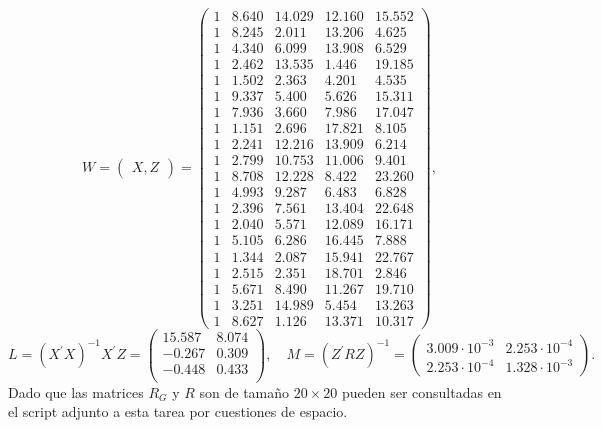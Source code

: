 \documentclass[10.5pt,notitlepage]{article}
\theoremstyle{plain}
\begin{document}
\begin{equation}\label{W}
    W = \begin{pmatrix}X , Z\end{pmatrix} = \begin{pmatrix}
1 &8.640 &14.029 &12.160 &15.552\\
 1& 8.245 &2.011&13.206 &4.625\\  
 1& 4.340 &6.099 & 13.908 &6.529\\
 1& 2.462 &13.535 & 1.446 &19.185\\
 1& 1.502 &2.363 &4.201 &4.535\\
 1& 9.337 &5.400 &5.626 &15.311\\
 1& 7.936 &3.660 &7.986 &17.047\\
 1& 1.151 &2.696 &17.821 &8.105\\
1& 2.241 &12.216 &13.909 &6.214\\ 
 1& 2.799 &10.753 &11.006 &9.401\\ 
 1 &8.708 &12.228 &8.422 &23.260\\
1& 4.993 &9.287 &6.483 &6.828\\
1& 2.396 &7.561 &13.404 &22.648\\
1& 2.040 &5.571& 12.089 &16.171\\
1& 5.105& 6.286 & 16.445 &7.888\\
1& 1.344& 2.087 &15.941 &22.767\\
1& 2.515& 2.351&18.701 &2.846\\
 1& 5.671& 8.490 &11.267 &19.710\\
1 &3.251& 14.989 &5.454 &13.263\\
1 &8.627& 1.126 &13.371 &10.317  
\end{pmatrix},
\end{equation}
\begin{equation}\label{L,M}
    L = (X^{'}X)^{-1}X^{'}Z =\begin{pmatrix}
15.587& 8.074\\
-0.267& 0.309\\
-0.448& 0.433\\
\end{pmatrix} ,\quad M = (Z^{'}R Z)^{-1} = \begin{pmatrix}
3.009\cdot 10^{-3} &2.253\cdot 10^{-4}\\
2.253\cdot 10^{-4} &1.328\cdot 10^{-3} 
\end{pmatrix}.
\end{equation}
Dado que las matrices \(R_G\) y \(R\) son de tamaño \(20\times20\) pueden ser consultadas en el script adjunto a esta tarea por cuestiones de espacio.\\
\end{document}
